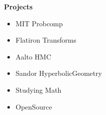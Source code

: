 \noindent \textbf{\Huge Projects}\\[0.3cm]

\begin{itemize}
    \item MIT Probcomp
    \item Flatiron Transforms
    \item Aalto HMC
    \item Sandor HyperbolicGeometry
    \item Studying Math
    \item OpenSource
\end{itemize}